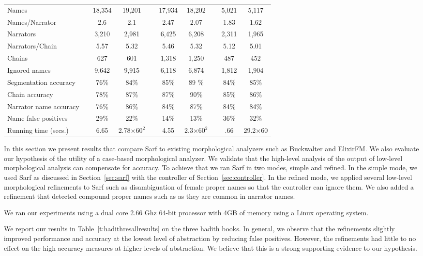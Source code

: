 \documentclass[11pt]{article}
\begin{document}
\begin{table*}[bt]
{\begin{tabular}{lp{.2cm}ccp{.2cm}ccp{.2cm}cc}
Names      & & 18,354 & 19,201 & & 17,934 &  18,202 & & 5,021 & 5,117 \\
Names/Narrator& & 2.6 & 2.1 & & 2.47 &  2.07 & & 1.83 & 1.62\\
Narrators & & 3,210 & 2,981 & & 6,425 &  6,208 & & 2,311 & 1,965 \\ 
Narrators/Chain & & 5.57 & 5.32 & & 5.46 &  5.32 & & 5.12 & 5.01 \\
Chains & & 627 & 601 &  & 1,318 & 1,250 & & 487 & 452 \\ 
Ignored names & & 9,642 & 9,915 &  & 6,118 & 6,874 & & 1,812 & 1,904 \\ \hline
Segmentation accuracy & & 76\%& 84\%& & 85\%& 89 \%& & 84\%& 85\%\\ 
Chain accuracy & & 78\% & 87\%&  & 87\%& 90\%& & 85\% & 86\% \\ 
Narrator name accuracy & & 76\% & 86\%& & 84\%& 87\% & & 84\% & 84\% \\ \hline
Name false positives & & 29\% & 22\%&  & 14\%& 13\% & & 36\% & 32\% \\ \hline
Running time (secs.)& & 6.65 & 2.78$\times60^2$& &4.55 & 2.3$\times60^2$ & & .66 & 29.2$\times$60 
\end{tabular}
}
\normalsize
\label{t:hadithresallresults}
\end{table*}

In this section we present results that compare Sarf to existing 
morphological analyzers such as Buckwalter and ElixirFM. 
We also evaluate our hypothesis of the utility of a case-based 
morphological analyzer.
We validate that the high-level analysis of the output 
of low-level morphological analysis can compensate for accuracy.
To achieve that we ran Sarf in two modes, simple and refined.
In the simple mode, we used Sarf as discussed in 
Section~\ref{sec:sarf} with the 
controller of Section~\ref{sec:controller}.
In the refined mode, we applied several low-level morphological 
refinements to Sarf such as disambiguation of 
female proper names so that the controller can ignore them. 
We also added a refinement that detected compound proper names 
such as  
as they are common in narrator names.

We ran our experiments using a dual core 2.66 Ghz 64-bit processor 
with 4GB of memory using a Linux operating system. 

We report our results in Table~\ref{t:hadithresallresults} on the 
three hadith books.
In general, we observe that the refinements slightly 
improved performance and accuracy at
the lowest level of abstraction by reducing false positives.
However, the refinements had little to no effect on the high 
accuracy measures at higher levels of abstraction.
We believe that this is a strong supporting evidence to our 
hypothesis.
\end{document}

